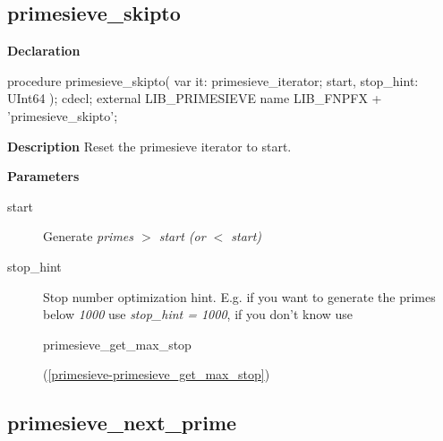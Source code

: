 \documentclass{report}
\newif\ifpdf
\begin{document}
\subsection*{primesieve{\_}skipto}
\fi
\label{primesieve-primesieve_skipto}
\begin{list}{}{
\setlength{\itemindent}{0cm}
\setlength{\listparindent}{0cm}
\setlength{\leftmargin}{\evensidemargin}
\addtolength{\leftmargin}{\tmplength}
\settowidth{\labelsep}{X}
\addtolength{\leftmargin}{\labelsep}
\setlength{\labelwidth}{\tmplength}
}
\item[\textbf{Declaration}\hfill]
\ifpdf
\begin{flushleft}
\fi
\begin{ttfamily}
procedure primesieve{\_}skipto( var it: primesieve{\_}iterator; start, stop{\_}hint: UInt64 ); cdecl; external LIB{\_}PRIMESIEVE name LIB{\_}FNPFX + 'primesieve{\_}skipto';\end{ttfamily}

\ifpdf
\end{flushleft}
\fi

\par
\item[\textbf{Description}]
Reset the primesieve iterator to start.



\par
\item[\textbf{Parameters}]
\begin{description}
\item[start] Generate \textit{primes {$>$} start (or {$<$} start)}
\item[stop{\_}hint] Stop number optimization hint. E.g. if you want to generate the primes below \textit{1000} use \textit{stop{\_}hint = 1000}, if you don't know use \begin{ttfamily}primesieve{\_}get{\_}max{\_}stop\end{ttfamily}(\ref{primesieve-primesieve_get_max_stop})
\end{description}


\end{list}
\ifpdf
\subsection*{\large{\textbf{primesieve{\_}next{\_}prime}}\normalsize\hspace{1ex}\hrulefill}
\else
\end{document}
